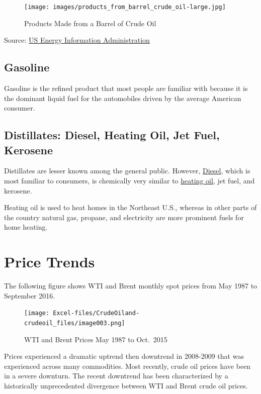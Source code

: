 \documentclass[
]{book}
\begin{document}
\begin{figure}
\centering
\texttt{[image: images/products\_from\_barrel\_crude\_oil-large.jpg]}
\caption{Products Made from a Barrel of Crude Oil}
\end{figure}

Source: \href{http://www.eia.gov/Energyexplained/index.cfm?page=oil_home}{US Energy Information Administration}

\hypertarget{gasoline}{%
\subsection{Gasoline}\label{gasoline}}

Gasoline is the refined product that most people are familiar with because it is the dominant liquid fuel for the automobiles driven by the average American consumer.

\hypertarget{distillates-diesel-heating-oil-jet-fuel-kerosene}{%
\subsection{Distillates: Diesel, Heating Oil, Jet Fuel, Kerosene}\label{distillates-diesel-heating-oil-jet-fuel-kerosene}}

Distillates are lesser known among the general public. However, \href{http://www.eia.gov/Energyexplained/index.cfm?page=diesel_home}{Diesel}, which is most familiar to consumers, is chemically very similar to \href{http://www.eia.gov/Energyexplained/index.cfm?page=heating_oil_use}{heating oil}, jet fuel, and kerosene.

Heating oil is used to heat homes in the Northeast U.S., whereas in other parts of the country natural gas, propane, and electricity are more prominent fuels for home heating.

\hypertarget{price-trends}{%
\section{Price Trends}\label{price-trends}}

The following figure shows WTI and Brent monthly spot prices from May 1987 to September 2016.

\begin{figure}
\centering
\texttt{[image: Excel-files/CrudeOiland-crudeoil\_files/image003.png]}
\caption{WTI and Brent Prices May 1987 to Oct.~2015}
\end{figure}

Prices experienced a dramatic uptrend then downtrend in 2008-2009 that was experienced across many commodities. Most recently, crude oil prices have been in a severe downturn. The recent downtrend has been characterized by a historically unprecedented divergence between WTI and Brent crude oil prices.
\end{document}
